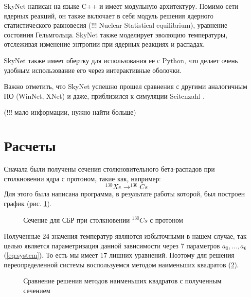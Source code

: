 \documentclass[%
master,    %
natbib,      %
subf,        %
href,        %
colorlinks,  %
]{disser}
\begin{document}
SkyNet написан на языке C++ и имеет модульную архитектуру. Помимо сети ядерных реакций, он также включает в себя модуль решения ядерного статистического равновесия (!!! Nuclear Statistical equilibrium), уравнение состояния Гельмгольца. SkyNet также моделирует эволюцию температуры, отслеживая изменение энтропии при ядерных реакциях и распадах.

SkyNet также имеет обертку для использования ее с Python, что делает очень удобным использование его через интерактивные оболочки.

Важно отметить, что SkyNet успешно прошел сравнения с другими аналогичным ПО (WinNet, XNet) и даже, приблизился к симуляции Seitenzahl \cite{simulation}.

(!!! мало информации, нужно найти больше)

\section{Расчеты}
Сначала были получены сечения столкновительного бета-распадов при столкновении ядра с протоном, такие как, например:
$$^{130}Xe \to ^{130}Cs$$
Для этого была написана программа, в результате работы которой, был построен график (рис. \ref{ris:1}).
\begin{figure}[h]
	\caption{Сечение для СБР при столкновении $^{130}Cs$ с протоном}
	\label{ris:1}
\end{figure}
Полученные 24 значения температур являются избыточными в нашем случае, так целью является параметризация данной зависимости через 7 параметров $a_0, ..., a_6$ (\ref{eq:system}). То есть мы имеет 17 лишних уравнений. Поэтому для решения переопределенной системы воспользуемся методом наименьших квадратов (\ref{ris:2}).

\begin{figure}[h]
	\caption{Сравнение решения методов наименьших квадратов с полученным сечением}
	\label{ris:2}
\end{figure}
\end{document}
